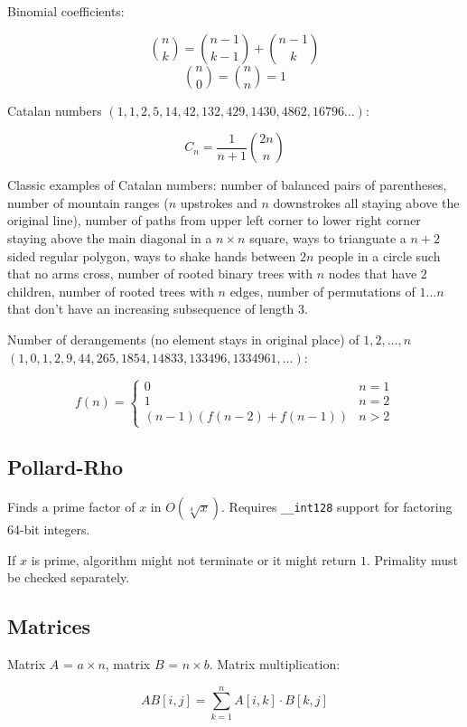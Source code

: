 \documentclass{article}
\begin{document}
Binomial coefficients:

\[ \binom{n}{k} = \binom{n-1}{k-1} + \binom{n-1}{k} \]
\[ \binom{n}{0} = \binom{n}{n} = 1 \]

Catalan numbers $(1, 1, 2, 5, 14, 42, 132, 429, 1430, 4862, 16796 \dots)$:

\[ C_n = \frac{1}{n+1} \binom{2n}{n} \]

Classic examples of Catalan numbers: number of balanced pairs of parentheses,  number of mountain ranges ($n$ upstrokes and $n$ downstrokes all staying above the original line), number of paths from upper left corner to lower right corner staying above the main diagonal in a $n \times n$ square, ways to trianguate a $n+2$ sided regular polygon, ways to shake hands between $2n$ people in a circle such that no arms cross, number of rooted binary trees with $n$ nodes that have $2$ children, number of rooted trees with $n$ edges, number of permutations of $1 \dots n$ that don't have an increasing subsequence of length $3$.

Number of derangements (no element stays in original place) of $1, 2, \dots, n$ $(1, 0, 1, 2, 9, 44, 265, 1854, 14833, 133496, 1334961, \dots)$:

\[
	f(n) =
	\begin{cases}
		0 &n = 1 \\
		1 &n = 2 \\
		(n-1)(f(n-2)+f(n-1)) &n > 2
	\end{cases}
\]

\subsection{Pollard-Rho}

Finds a prime factor of $x$ in $O(\sqrt[4]{x})$. Requires \verb|__int128| support for factoring 64-bit integers.

If $x$ is prime, algorithm might not terminate or it might return $1$. Primality must be checked separately.



\subsection {Matrices}

Matrix $A$ = $a \times n$, matrix $B$ = $n \times b$. Matrix multiplication:

\[ AB[i,j] = \sum_{k=1}^{n} A[i,k] \cdot B[k,j] \]
\end{document}
